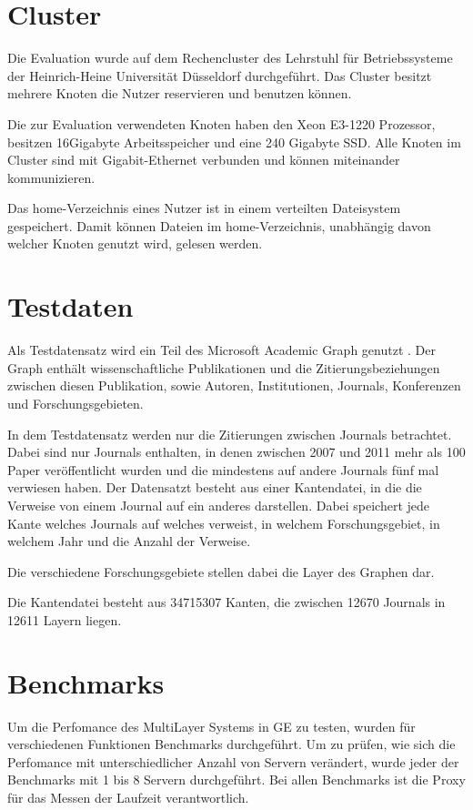 
\section{Cluster}

Die Evaluation wurde auf dem Rechencluster des Lehrstuhl für Betriebssysteme der Heinrich-Heine Universität Düsseldorf durchgeführt.
Das Cluster besitzt mehrere Knoten die Nutzer reservieren und benutzen können.

Die zur Evaluation verwendeten Knoten haben den Xeon E3-1220 Prozessor, besitzen 16Gigabyte Arbeitsspeicher und eine 240 Gigabyte SSD.
Alle Knoten im Cluster sind mit Gigabit-Ethernet verbunden und können miteinander kommunizieren. 

Das home-Verzeichnis eines Nutzer ist in einem verteilten Dateisystem gespeichert. Damit können Dateien im home-Verzeichnis, unabhängig davon welcher Knoten genutzt wird, gelesen werden.

\section{Testdaten}


Als Testdatensatz wird ein Teil des Microsoft Academic Graph genutzt \cite{sinha2015an}. Der Graph enthält wissenschaftliche Publikationen und die Zitierungsbeziehungen zwischen diesen Publikation, sowie Autoren, Institutionen, Journals, Konferenzen und Forschungsgebieten.

In dem Testdatensatz werden nur die Zitierungen zwischen Journals betrachtet. Dabei sind nur Journals enthalten, in denen zwischen 2007 und 2011 mehr als 100 Paper veröffentlicht wurden und die mindestens auf andere Journals fünf mal verwiesen haben.
Der Datensatzt besteht aus einer Kantendatei, in die die Verweise von einem Journal auf ein anderes darstellen. Dabei speichert jede Kante welches Journals auf welches verweist, in welchem Forschungsgebiet, in welchem Jahr und die Anzahl der Verweise.

Die verschiedene Forschungsgebiete stellen dabei die Layer des Graphen dar.

Die Kantendatei besteht aus 34715307 Kanten, die zwischen 12670 Journals in 12611 Layern liegen.


\section{Benchmarks}

Um die Perfomance des MultiLayer Systems in GE zu testen, wurden für verschiedenen Funktionen Benchmarks durchgeführt. Um zu prüfen, wie sich die Perfomance mit unterschiedlicher Anzahl von Servern verändert,
wurde jeder der Benchmarks mit 1 bis 8 Servern durchgeführt. Bei allen Benchmarks ist die Proxy für das Messen der Laufzeit verantwortlich.

